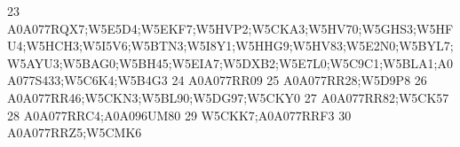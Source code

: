 \documentclass{beamer}
\begin{document}
\begin{frame}[fragile]
\begin{itemize}
\begin{Schunk}
\begin{Soutput}
23                                                                                                                                                                           A0A077RQX7;W5E5D4;W5EKF7;W5HVP2;W5CKA3;W5HV70;W5GHS3;W5HFU4;W5HCH3;W5I5V6;W5BTN3;W5I8Y1;W5HHG9;W5HV83;W5E2N0;W5BYL7;W5AYU3;W5BAG0;W5BH45;W5EIA7;W5DXB2;W5E7L0;W5C9C1;W5BLA1;A0A077S433;W5C6K4;W5B4G3
24                                                                                                                                                                                                                                                                                                                                                                     A0A077RR09
25                                                                                                                                                                                                                                                                                                                                                              A0A077RR28;W5D9P8
26                                                                                                                                                                                                                                                                                                                                         A0A077RR46;W5CKN3;W5BL90;W5DG97;W5CKY0
27                                                                                                                                                                                                                                                                                                                                                              A0A077RR82;W5CK57
28                                                                                                                                                                                                                                                                                                                                                          A0A077RRC4;A0A096UM80
29                                                                                                                                                                                                                                                                                                                                                              W5CKK7;A0A077RRF3
30                                                                                                                                                                                                                                                                                                                                                              A0A077RRZ5;W5CMK6

\end{Soutput}
\end{Schunk}
\end{itemize}
\end{frame}
\end{document}
